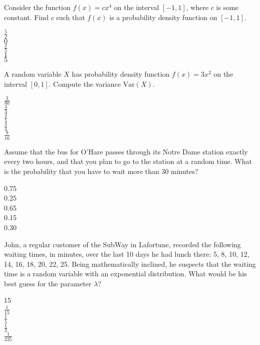 \documentclass[12pt]{amsart}
\begin{document}
\begin{exam}
\begin{problem}
Consider the function $f(x) = cx^4$ on the interval $[-1,1]$, where
$c$ is some constant.  Find $c$ such that $f(x)$ is a probability
density function on $[-1,1]$.
%
\begin{answers}{1}
$\frac{5}{2}$ \\
$0$ \\
$\frac{2}{5}$ \\
$1$ \\
$5$\\
%
\end{answers}
\end{problem}



\begin{problem}
A random variable $X$ has probability density function $f(x) = 3x^2$
on the interval $[0,1]$.  Compute the variance $\mbox{Var}(X)$.  
%
\begin{answers}{1}
$\frac{3}{80}$ \\
$\frac{4}{3}$ \\
$\frac{3}{5}$ \\
$\frac{3}{4}$ \\
$\frac{9}{16}$ \\
%
\end{answers}
\end{problem}


\begin{problem}
Assume that the bus for O'Hare passes through 
its Notre Dame station exactly every two hours, and that you plan to go 
to the station at a random time.  
What is the probability that you have to wait more
than 30 minutes?
%
\begin{answers}{1}
0.75\\
0.25\\
0.65\\
0.15 \\
0.30\\
%
\end{answers}
\end{problem}



\begin{problem}
John, a regular customer of the SubWay in Lafortune, recorded the 
following waiting times, in minutes, over the last 10 days he had lunch there: 
5, 8, 10, 12, 14, 16, 18, 20, 22, 25.  Being mathematically inclined, he
suspects that the waiting time is a random variable with an exponential
distribution.  What would be his best guess for the parameter $\lambda $?
%
\begin{answers}{1}
15	\\
$\frac{1}{15}$	\\
$\frac{1}{5}$ \\
$\frac{1}{3}$ \\
$\frac{1}{225}$\\
%
\end{answers}
\end{problem}





\end{exam}
\end{document}
